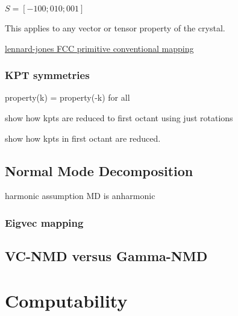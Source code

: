 \documentclass[letterpaper,12pt,amsmath,amssymb]{article}
\begin{document}
$S = [-100;010;001 ]$


This applies to any vector or tensor property of the crystal.
      
\cite{sinha_scattering_2005}

\href{https://github.com/jasonlarkin/disorder/blob/master/matlab/lj/phonon/LJ_PRIM_CONV_MAPPING.m}
{lennard-jones FCC primitive conventional mapping}


\subsubsection{KPT symmetries}

property(k) = property(-k)  for all

show how kpts are reduced to first octant using just rotations

show how kpts in first octant are reduced.

\subsection{Normal Mode Decomposition}
harmonic assumption
MD is anharmonic

\subsubsection{Eigvec mapping}

\subsection{VC-NMD versus Gamma-NMD}


\section{Computability}
\end{document}
